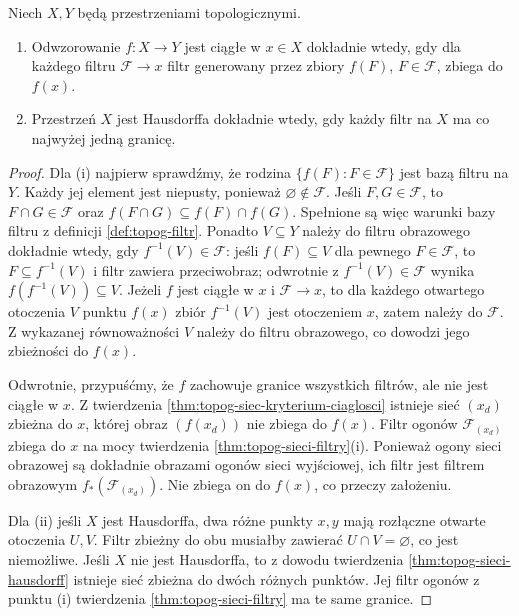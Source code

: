 \begin{wniosek}
\label{cor:topog-filtr-ciaglosc-hausdorff}
Niech $X,Y$ będą przestrzeniami topologicznymi.
\begin{enumerate}[label=(\roman*)]
\item Odwzorowanie $f\colon X\to Y$ jest ciągłe
w $x\in X$ dokładnie wtedy, gdy dla każdego filtru
$\mathcal F\to x$ filtr generowany przez zbiory
$f(F)$, $F\in\mathcal F$, zbiega do $f(x)$.
\item Przestrzeń $X$ jest Hausdorffa dokładnie wtedy,
gdy każdy filtr na $X$ ma co najwyżej jedną granicę.
\end{enumerate}
\end{wniosek}
\begin{proof}
Dla (i) najpierw sprawdźmy, że rodzina
$\{f(F):F\in\mathcal F\}$ jest bazą filtru na $Y$.
Każdy jej element jest niepusty, ponieważ
$\varnothing\notin\mathcal F$. Jeśli $F,G\in\mathcal F$,
to $F\cap G\in\mathcal F$ oraz
$f(F\cap G)\subseteq f(F)\cap f(G)$.
Spełnione są więc warunki bazy filtru z
 definicji \ref{def:topog-filtr}.
Ponadto $V\subseteq Y$ należy do filtru obrazowego
dokładnie wtedy, gdy
$f^{-1}(V)\in\mathcal F$: jeśli $f(F)\subseteq V$
dla pewnego $F\in\mathcal F$, to
$F\subseteq f^{-1}(V)$ i filtr zawiera przeciwobraz;
odwrotnie z $f^{-1}(V)\in\mathcal F$ wynika
$f(f^{-1}(V))\subseteq V$.
Jeżeli $f$ jest ciągłe w $x$ i $\mathcal F\to x$,
to dla każdego otwartego otoczenia $V$ punktu $f(x)$
zbiór $f^{-1}(V)$ jest otoczeniem $x$, zatem należy
do $\mathcal F$. Z wykazanej równoważności
$V$ należy do filtru obrazowego, co dowodzi jego
zbieżności do $f(x)$.

Odwrotnie, przypuśćmy, że $f$ zachowuje granice
wszystkich filtrów, ale nie jest ciągłe w $x$.
Z twierdzenia \ref{thm:topog-siec-kryterium-ciaglosci}
istnieje sieć $(x_d)$ zbieżna do $x$, której obraz
$(f(x_d))$ nie zbiega do $f(x)$. Filtr ogonów
$\mathcal F_{(x_d)}$ zbiega do $x$ na mocy
twierdzenia \ref{thm:topog-sieci-filtry}(i).
Ponieważ ogony sieci obrazowej są dokładnie
obrazami ogonów sieci wyjściowej, ich filtr
jest filtrem obrazowym $f_*(\mathcal F_{(x_d)})$.
Nie zbiega on do $f(x)$, co przeczy założeniu.

Dla (ii) jeśli $X$ jest Hausdorffa, dwa różne punkty
$x,y$ mają rozłączne otwarte otoczenia $U,V$.
Filtr zbieżny do obu musiałby zawierać
$U\cap V=\varnothing$, co jest niemożliwe.
Jeśli $X$ nie jest Hausdorffa, to z dowodu
twierdzenia \ref{thm:topog-sieci-hausdorff}
istnieje sieć zbieżna do dwóch różnych punktów.
Jej filtr ogonów z punktu (i) twierdzenia
\ref{thm:topog-sieci-filtry} ma te same granice.
\end{proof}

